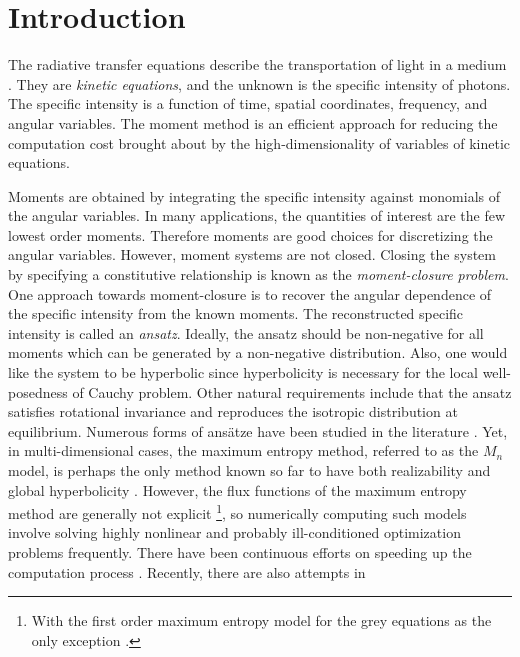 

\section{Introduction}

The radiative transfer equations describe the transportation of light in a medium
\cite{pomraning1973equations}. They are \emph{kinetic equations}, and the unknown 
is the specific intensity of photons. The specific intensity is a function of time, 
spatial coordinates, frequency, and angular variables. The moment method is an 
efficient approach for reducing the computation cost brought about by the high-dimensionality of 
variables of kinetic equations.

Moments are obtained by integrating the specific intensity against
monomials of the angular variables. In many applications, the
quantities of interest are the few lowest order moments. Therefore
moments are good choices for discretizing the angular variables.
However, moment systems are not closed. Closing the system by
specifying a constitutive relationship is known as the
\emph{moment-closure problem}. One approach towards moment-closure is
to recover the angular dependence of the specific intensity from the
known moments. The reconstructed specific intensity is called an
\emph{ansatz}. Ideally, the ansatz should be non-negative for all
moments which can be generated by a non-negative distribution. Also,
one would like the system to be hyperbolic since hyperbolicity is
necessary for the local well-posedness of Cauchy problem.  Other
natural requirements include that the ansatz satisfies rotational
invariance and reproduces the isotropic distribution at equilibrium.
Numerous forms of ans\"atze have been studied in the literature
\cite{pomraning1973equations, Lewis-Miller-1984}.  Yet, in
multi-dimensional cases, the maximum entropy method, referred to as
the $M_n$ model, is perhaps the
only method known so far to have both realizability and global
hyperbolicity \cite{Dubroca-Feugas-1999}. However, the flux functions
of the maximum entropy method are generally not explicit
\footnote{
With the first order maximum entropy model for the grey equations as the only exception
\cite{Dubroca-Feugas-1999}.
}, so
numerically computing such models involve solving highly
nonlinear and probably ill-conditioned optimization problems
frequently. There have been continuous efforts on speeding up the
computation process \cite{alldredge2012high, alldredge2014adaptive,
  garrett2015optimization}. Recently, there are also attempts in
